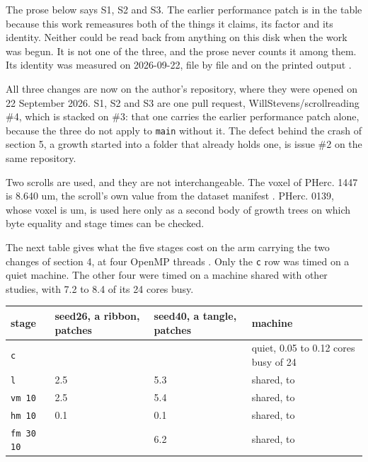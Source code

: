 The prose below says S1, S2 and S3. The earlier performance patch is in the table because this work remeasures both of the things it claims, its factor and its identity. Neither could be read back from anything on this disk when the work was begun. It is not one of the three, and the prose never counts it among them. Its identity was measured on 2026-09-22, file by file and on the printed output {}.

All three changes are now on the author's repository, where they were opened on 22 September 2026. S1, S2 and S3 are one pull request, WillStevens/scrollreading \#4, which is stacked on \#3: that one carries the earlier performance patch alone, because the three do not apply to \texttt{main} without it. The defect behind the crash of section 5, a growth started into a folder that already holds one, is issue \#2 on the same repository.

Two scrolls are used, and they are not interchangeable. The voxel of PHerc. 1447 is 8.640 um, the scroll's own value from the dataset manifest {}. PHerc. 0139, whose voxel is \VoxelZeroOneThreeNine{} um, is used here only as a second body of growth trees on which byte equality and stage times can be checked.

The next table gives what the five stages cost on the arm carrying the two changes of section 4, at four OpenMP threads {}. Only the \texttt{c} row was timed on a quiet machine. The other four were timed on a machine shared with other studies, with 7.2 to 8.4 of its 24 cores busy.

\begin{table}[t]
\centering
\small
\begin{tabularx}{\textwidth}{XXXX}
\toprule
stage & seed26, a ribbon, \SeedPatchesTwentySix{} patches & seed40, a tangle, \SeedPatchesForty{} patches & machine \\
\midrule
\texttt{c} & \BenchBothSeedTwentySixMedian{} & \BenchBothSeedFortyMedian{} & quiet, 0.05 to 0.12 cores busy of 24 \\
\texttt{l} & 2.5 & 5.3 & shared, \StageLoadLow{} to \StageLoadHigh{} \\
\texttt{vm 10} & 2.5 & 5.4 & shared, \StageLoadLow{} to \StageLoadHigh{} \\
\texttt{hm 10} & 0.1 & 0.1 & shared, \StageLoadLow{} to \StageLoadHigh{} \\
\texttt{fm 30 10} & \StageFmSecondsSeedTwentySix{} & 6.2 & shared, \StageLoadLow{} to \StageLoadHigh{} \\
\bottomrule
\end{tabularx}
\end{table}

